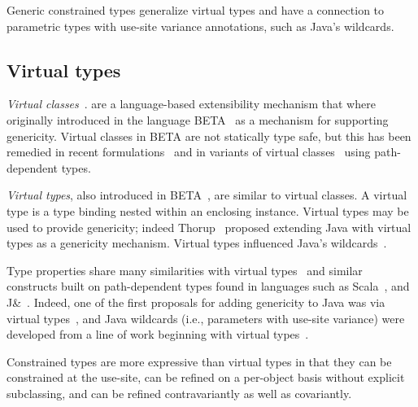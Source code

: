 
Generic constrained types generalize virtual types and 
have a connection to parametric types with use-site variance
annotations, such as Java's wildcards.  

\subsection{Virtual types}

{\em Virtual classes}~\cite{beta,mp89-virtual-classes,ernst06-virtual}.
are a language-based extensibility
mechanism that where
originally introduced in the language
BETA~\cite{beta} as a mechanism
for supporting genericity.
Virtual classes in BETA are not statically type safe, but this has been
remedied in recent formulations~\cite{ernst99-gbeta,ernst06-virtual} and in
variants of 
virtual classes~\cite{scala,nqm06,cdnw07-tribe,variant-path-types}
using path-dependent types.  

{\em Virtual types}, also introduced in BETA~\cite{beta},
are similar to virtual
classes.  A virtual type is a type binding nested within an
enclosing instance.
Virtual types
may be used to provide genericity; indeed
Thorup~\cite{thorup97} proposed extending Java with virtual types
as a genericity mechanism.  Virtual types influenced Java's 
wildcards~\cite{adding-wildcards,Java3,wildcards-safe}.



Type properties share many similarities with virtual
types~\cite{mp89-virtual-classes,beta,ernst99-gbeta,ernst06-virtual,cdnw07-tribe}
and similar constructs built on path-dependent types found in
languages such as Scala~\cite{scala}, and J\&~\cite{nqm06}.
Indeed, one of the first proposals for adding genericity to Java
was via virtual types~\cite{thorup97}, and Java
wildcards (i.e., parameters with use-site variance)
were developed from a line of work beginning with virtual
types~\cite{unifying-genericity,variant-parametric-types,adding-wildcards}.

Constrained types are more expressive than virtual
types in that they can be constrained at the use-site,
can be refined on a per-object basis without explicit subclassing,
and can be refined contravariantly
as well as covariantly.

